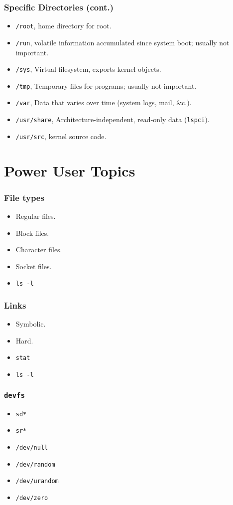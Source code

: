 \documentclass[xcolor={dvipsnames,svgnames},hyperref=dvips]{beamer}
\begin{document}
	\begin{frame}
		\frametitle{Specific Directories (cont.)}
		\begin{itemize}
		\item \texttt{/root}, home directory for root.
		\item \texttt{/run}, volatile information accumulated since system boot; usually not important.
		\item \texttt{/sys}, Virtual filesystem, exports kernel objects.
		\item \texttt{/tmp}, Temporary files for programs; usually not important.
		\item \texttt{/var}, Data that varies over time (system logs, mail, \&c.).
		\item \texttt{/usr/share}, Architecture-independent, read-only data (\texttt{lspci}).
		\item \texttt{/usr/src}, kernel source code.
		\end{itemize}
	\end{frame}

\section{Power User Topics}\label{section:poweruser}
	\begin{frame}
		\frametitle{File types}
		\begin{itemize}
		\item Regular files.
		\item Block files.
		\item Character files.
		\item Socket files.
		\item \texttt{ls -l}
		\end{itemize}
	\end{frame}

	\begin{frame}
		\frametitle{Links}
		\begin{itemize}
		\item Symbolic.
		\item Hard.
		\item \texttt{stat}
		\item \texttt{ls -l}
		\end{itemize}
	\end{frame}

	\begin{frame}
		\frametitle{\texttt{devfs}}
		\begin{itemize}
		\item \texttt{sd*}
		\item \texttt{sr*}
		\item \texttt{/dev/null}
		\item \texttt{/dev/random}
		\item \texttt{/dev/urandom}
		\item \texttt{/dev/zero}
		\end{itemize}
	\end{frame}
\end{document}
